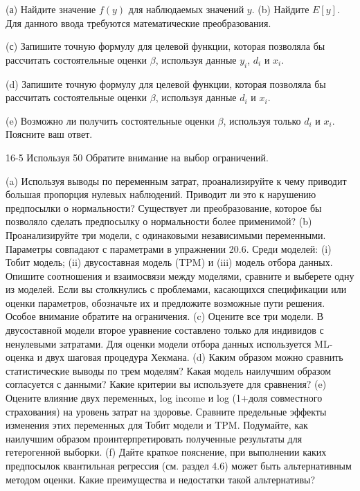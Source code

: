 (а) Найдите значение $f(y)$ для наблюдаемых значений $y$.
(b) Найдите $E[y]$. Для данного ввода требуются математические преобразования.


(с) Запишите точную формулу для целевой функции, которая позволяла бы рассчитать состоятельные оценки $\beta$, используя данные $y_i$, $d_i$ и $x_i$.

(d) Запишите точную формулу для целевой функции, которая позволяла бы рассчитать состоятельные оценки $\beta$, используя данные $d_i$ и $x_i$.

(e) Возможно ли получить состоятельные оценки $\beta$, используя только $d_i$ и $x_i$. Поясните ваш ответ.

16-5 
Используя 50%
Обратите внимание на выбор ограничений.

(a)	Используя выводы по переменным затрат, проанализируйте к чему приводит большая пропорция нулевых наблюдений. Приводит ли это к нарушению предпосылки о нормальности? Существует ли преобразование, которое бы позволяло сделать предпосылку о нормальности более применимой?
(b)	Проанализируйте три модели, с одинаковыми независимыми переменными. Параметры совпадают с параметрами в упражнении 20.6. Среди моделей: (i) Тобит модель; (ii) двусоставная модель (TPM) и (iii) модель отбора данных. Опишите соотношения и взаимосвязи между моделями, сравните и выберете одну из моделей. Если вы столкнулись с проблемами, касающихся спецификации или оценки параметров, обозначьте их и предложите возможные пути решения. Особое внимание обратите на ограничения.
(c)	Оцените все три модели. В двусоставной модели второе уравнение составлено только для индивидов с ненулевыми затратами. Для оценки модели отбора данных используется ML-оценка и двух шаговая процедура Хекмана. 
(d)	Каким образом можно сравнить статистические выводы по трем моделям? Какая модель наилучшим образом согласуется с данными? Какие критерии вы используете для сравнения?
(e)	Оцените влияние двух переменных, log income и log (1+доля совместного страхования) на уровень затрат на здоровье. Сравните предельные эффекты изменения этих переменных для Тобит модели и TPM. Подумайте, как наилучшим образом проинтерпретировать полученные результаты для гетерогенной выборки.
(f)	Дайте краткое пояснение, при выполнении каких предпосылок квантильная регрессия (см. раздел 4.6) может быть альтернативным методом оценки. Какие преимущества и недостатки такой альтернативы?



